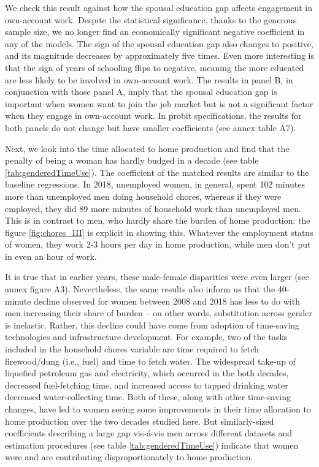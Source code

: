 We check this result against how the spousal education gap affects engagement in own-account work. Despite the statistical significance, thanks to the generous sample size, we no longer find an economically significant negative coefficient in any of the models. The sign of the spousal education gap also changes to positive, and its magnitude decreases by approximately five times. Even more interesting is that the sign of years of schooling flips to negative, meaning the more educated are less likely to be involved in own-account work. The results in panel B, in conjunction with those panel A, imply that the spousal education gap is important when women want to join the job market but is not a significant factor when they engage in own-account work. In probit specifications, the results for both panels do not change but have smaller coefficients (see annex table A7).\par

Next, we look into the time allocated to home production and find that the penalty of being a woman has hardly budged in a decade (see table \ref{tab:genderedTimeUse}). The coefficient of the matched results are similar to the baseline regressions. In 2018, unemployed women, in general, spent 102 minutes more than unemployed men doing household chores, whereas if they were employed, they did 89 more minutes of household work than unemployed men. This is in contrast to men, who hardly share the burden of home production: the figure \ref{fig:chores_III} is explicit in showing this. Whatever the employment status of women, they work 2-3 hours per day in home production, while men don’t put in even an hour of work.\par

 

It is true that in earlier years, these male-female disparities were even larger (see annex figure A3). Nevertheless, the same results also inform us that the 40-minute decline observed for women between 2008 and 2018 has less to do with men increasing their share of burden -- on other words, substitution across gender is inelastic. Rather, this decline could have come from adoption of time-saving technologies and infrastructure development. For example, two of the tasks included in the household chores variable are time required to fetch firewood/dung (i.e., fuel) and time to fetch water. The widespread take-up of liquefied petroleum gas and electricity, which occurred in the both decades, decreased fuel-fetching time, and increased access to tapped drinking water decreased water-collecting time. Both of these, along with other time-saving changes, have led to women seeing some improvements in their time allocation to home production over the two decades studied here. But similarly-sized coefficients describing a large gap vis-\'{a}-vis men across different datasets and estimation procedures (see table \ref{tab:genderedTimeUse}) indicate that women were and are contributing disproportionately to home production.\par

